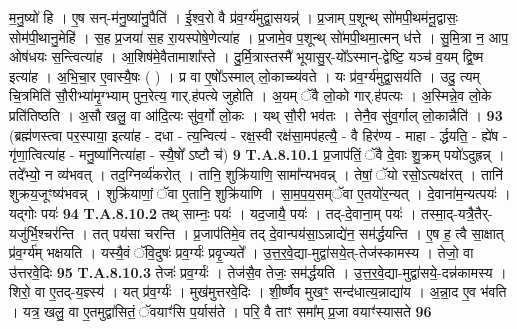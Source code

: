 \documentclass[17pt]{extarticle}
\begin{document}
                  म॒नु॒ष्यो॑ हि । ए॒ष सन्-म॑नु॒ष्या॑नु॒पैति॑ ।  ई॒श्व॒रो वै प्र॑व॒र्ग्य॑मुद्वा॒सयन्न्॑ । प्र॒जाम् प॒शून्थ् सो॑मपी॒थम॑नू॒द्वासः॒ सोम॑पी॒थानु॒मेहि॑ । स॒ह प्र॒जया॑ स॒ह रा॒यस्पोषे॒णेत्या॑ह । प्र॒जामे॒व प॒शून्थ् सो॑मपी॒थमा॒त्मन् ध॑त्ते । सु॒मि॒त्रा न॒ आप॒ ओष॑धयः स॒न्त्वित्या॑ह । आ॒शिष॑मे॒वैतामाशा᳚स्ते ।  दु॒र्मि॒त्रास्तस्मै॑ भूयासु॒र्-यो᳚ऽस्मान्-द्वेष्टि॒ यञ्च॑ व॒यम् द्वि॒ष्म इत्या॑ह । अ॒भि॒चा॒र ए॒वास्यै॒षः ( ) । प्र वा ए॒षो᳚ऽस्माल् लो॒काच्च्य॑वते ।  यः प्र॑व॒र्ग्य॑मुद्वा॒सय॑ति । उदु॒ त्यम् चि॒त्रमिति॑ सौ॒रीभ्या॑मृ॒ग्भ्याम् पुन॒रेत्य॒ गार्.ह॑पत्ये जुहोति ।  अ॒यम् ॅवै लो॒को गार्.ह॑पत्यः । अ॒स्मिन्ने॒व लो॒के प्रति॑तिष्ठति ।  अ॒सौ खलु॒ वा आ॑दि॒त्यः सु॑व॒र्गो लो॒कः ।  यथ् सौ॒री भव॑तः । तेनै॒व सु॑व॒र्गाल् लो॒कान्नैति॑ । \textbf{ 93} \newline
                  \newline
                                                        (ब्रह्म॑णस्त्वा पर॒स्पाया॒ इत्या॑ह - दधा - त्य॒न्वित्य॑ - रक्ष॒स्वी रक्ष॑सा॒मप॑हत्यै॒ - वै हिर॑ण्य - माहा - र्द्धयति॒ - ह्ये॑ष - गृ॑णा॒त्वित्या॑ह - मनु॒ष्या॑नित्या॑हा - स्यै॒षो᳚ ऽष्टौ च॑) \textbf{9} \newline \newline
                                \textbf{ T.A.8.10.1} \newline
                  प्र॒जाप॑तिं॒ ॅवै दे॒वाः शु॒क्रम् पयो॑ऽदुह्रन्न् । तदे᳚भ्यो॒ न व्य॑भवत् । तद॒ग्निर्व्य॑करोत् । तानि॒ शुक्रि॑याणि॒ सामा᳚न्यभवन्न् । तेषां॒ ॅयो रसो॒ऽत्यक्ष॑रत् । तानि॑ शुक्रय॒जूꣳष्य॑भवन्न् ।  शुक्रि॑याणां॒ ॅवा ए॒तानि॒ शुक्रि॑याणि । सा॒म॒प॒य॒सम्ॅवा ए॒तयो॑र॒न्यत् ।  दे॒वाना॑म॒न्यत्पयः॑ । यद्गोः पयः॑ \textbf{ 94} \newline
                  \newline
                                                                  \textbf{ T.A.8.10.2} \newline
                  तथ् साम्नः॒ पयः॑ । यद॒जायै॒ पयः॑ । तद्-दे॒वाना॒म् पयः॑ । तस्मा॒द्-यत्रै॒तैर्-यजु॑र्भि॒श्चर॑न्ति । तत् पय॑सा चरन्ति । प्र॒जाप॑तिमे॒व तद् दे॒वान्पय॑सा॒ऽन्नाद्ये॑न॒ सम॑र्द्धयन्ति । ए॒ष ह॒ त्वै सा॒क्षात् प्र॑व॒र्ग्य॑म् भक्षयति । यस्यै॒वं ॅवि॒दुषः॑ प्रव॒र्ग्यः॑ प्रवृ॒ज्यते᳚ । उ॒त्त॒र॒वे॒द्या-मुद्वा॑सये॒त्-तेज॑स्कामस्य । तेजो॒ वा उ॑त्तरवे॒दिः \textbf{ 95} \newline
                  \newline
                                                                  \textbf{ T.A.8.10.3} \newline
                  तेजः॑ प्रव॒र्ग्यः॑ । तेज॑सै॒व तेजः॒ सम॑र्द्धयति ।  उ॒त्त॒र॒वे॒द्या-मुद्वा॑सये॒-दन्न॑कामस्य । शिरो॒ वा ए॒तद्-य॒ज्ञ्स्य॑ । यत् प्र॑व॒र्ग्यः॑ । मुख॑मुत्तरवे॒दिः ।  शी॒र्ष्णैव मुखꣳ॒॒ सन्द॑धात्य॒न्नाद्या॑य । अ॒न्ना॒द ए॒व भ॑वति । यत्र॒ खलु॒ वा ए॒तमुद्वा॑सितं॒ ॅवयाꣳ॑सि प॒र्यास॑ते । परि॒ वै ताꣳ समा᳚म् प्र॒जा वयाꣳ॑स्यासते \textbf{ 96} \newline
\end{document}
